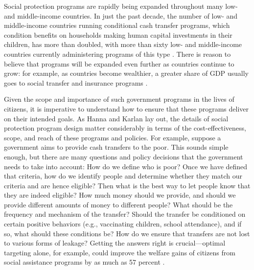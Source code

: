 Social protection programs are rapidly being expanded throughout many low- and middle-income countries. In just the past decade, the number of low- and middle-income countries running conditional cash transfer programs, which condition benefits on households making human capital investments in their children, has more than doubled, with more than sixty low- and middle-income countries currently administering programs of this type \citep{worldbank2018}. There is reason to believe that programs will be expanded even further as countries continue to grow: for example, as countries become wealthier, a greater share of GDP usually goes to social transfer and insurance programs \citep{chetty2006}.

Given the scope and importance of such government programs in the lives of citizens, it is imperative to understand how to ensure that these programs deliver on their intended goals. As Hanna and Karlan \citeyearpar{hanna2017} lay out, the details of social protection program design matter considerably in terms of the cost-effectiveness, scope, and reach of these programs and policies. For example, suppose a government aims to provide cash transfers to the poor. This sounds simple enough, but there are many questions and policy decisions that the government needs to take into account: How do we define who is poor? Once we have defined that criteria, how do we identify people and determine whether they match our criteria and are hence eligible? Then what is the best way to let people know that they are indeed eligible? How much money should we provide, and should we provide different amounts of money to different people? What should be the frequency and mechanism of the transfer? Should the transfer be conditioned on certain positive behaviors (e.g., vaccinating children, school attendance), and if so, what should these conditions be? How do we ensure that transfers are not lost to various forms of leakage? Getting the answers right is crucial---optimal targeting alone, for example, could improve the welfare gains of citizens from social assistance programs by as much as 57 percent \citep{alatas2019}.

